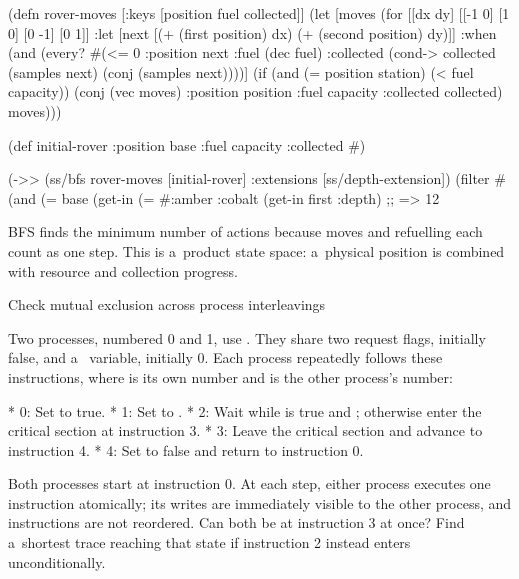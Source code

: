 {{(defn rover-moves [{:keys [position fuel collected]}]
  (let [moves
        (for [[dx dy] [[-1 0] [1 0] [0 -1] [0 1]]
              :let [next [(+ (first position) dx)
                          (+ (second position) dy)]]
              :when (and (every? #(<= 0 %
          {:position next
           :fuel (dec fuel)
           :collected (cond-> collected
                        (samples next) (conj (samples next)))})]
    (if (and (= position station) (< fuel capacity))
      (conj (vec moves)
            {:position position
             :fuel capacity
             :collected collected})
      moves)))

(def initial-rover
  {:position base :fuel capacity :collected #{}})

(->> (ss/bfs rover-moves [initial-rover]
                 {:extensions [ss/depth-extension]})
     (filter #(and (= base (get-in %
                   (= #{:amber :cobalt}
                      (get-in %
     first
     :depth)
;; => 12
\endtt

BFS finds the minimum number of actions because moves and refuelling each
count as one step. This is a~product state space: a~physical position is
combined with resource and collection progress.

\secc Check mutual exclusion across process interleavings

 Two processes, numbered 0 and 1, use
. They share two request flags, initially false,
and a~ variable, initially 0. Each process repeatedly follows
these instructions, where  is its own number and  is the
other process's number:

\begitems
* 0: Set  to true.
* 1: Set  to .
* 2: Wait while  is true and ; otherwise
  enter the critical section at instruction 3.
* 3: Leave the critical section and advance to instruction 4.
* 4: Set  to false and return to instruction 0.
\enditems

Both processes start at instruction 0. At each step, either process
executes one instruction atomically; its writes are immediately visible
to the other process, and instructions are not reordered. Can both be at
instruction 3 at once? Find a~shortest trace reaching that state if
instruction 2 instead enters unconditionally.

}}
